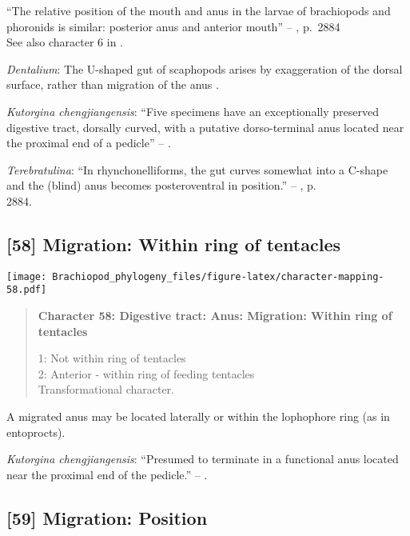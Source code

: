 \documentclass[openany]{book}
\theoremstyle{definition}
\theoremstyle{definition}
\theoremstyle{definition}
\theoremstyle{remark}
\begin{document}
``The relative position of the mouth and anus in the larvae of
brachiopods and phoronids is similar: posterior anus and anterior
mouth'' -- \citet{Williams2007Supplement}, p.~2884\\
See also character 6 in \citet{Haszprunar2008}.

\hypertarget{Dentalium-coding-57}{}
\emph{Dentalium}: The U-shaped gut of scaphopods arises by exaggeration
of the dorsal surface, rather than migration of the anus
\citep{Steiner1992}.

\hypertarget{Kutorgina_chengjiangensis-coding-57}{}
\emph{Kutorgina chengjiangensis}: ``Five specimens have an exceptionally
preserved digestive tract, dorsally curved, with a putative
dorso-terminal anus located near the proximal end of a pedicle'' --
\citet{Zhang2007Rhynchonelliformeanbrachiopods}.

\hypertarget{Terebratulina-coding-57}{}
\emph{Terebratulina}: ``In rhynchonelliforms, the gut curves somewhat
into a C-shape and the (blind) anus becomes posteroventral in
position.'' -- \citet{Williams2007Supplement}, p.\\
2884.

\subsection*{{[}58{]} Migration: Within ring of
tentacles}\label{migration-within-ring-of-tentacles}

\texttt{[image: Brachiopod\_phylogeny\_files/figure-latex/character-mapping-58.pdf]}

\begin{quote}
\textbf{Character 58: Digestive tract: Anus: Migration: Within ring of
tentacles}

1: Not within ring of tentacles\\
2: Anterior - within ring of feeding tentacles\\
Transformational character.
\end{quote}

A migrated anus may be located laterally or within the lophophore ring
(as in entoprocts).

\hypertarget{Kutorgina_chengjiangensis-coding-58}{}
\emph{Kutorgina chengjiangensis}: ``Presumed to terminate in a
functional anus located near the proximal end of the pedicle.'' --
\citet{Zhang2007Rhynchonelliformeanbrachiopods}.

\subsection*{{[}59{]} Migration: Position}\label{migration-position}
\end{document}

